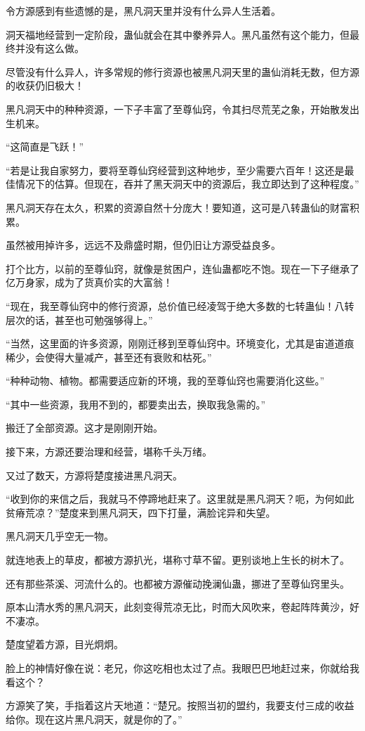 \begin{this_body}
令方源感到有些遗憾的是，黑凡洞天里并没有什么异人生活着。

洞天福地经营到一定阶段，蛊仙就会在其中豢养异人。黑凡虽然有这个能力，但最终并没有这么做。

尽管没有什么异人，许多常规的修行资源也被黑凡洞天里的蛊仙消耗无数，但方源的收获仍旧极大！

黑凡洞天中的种种资源，一下子丰富了至尊仙窍，令其扫尽荒芜之象，开始散发出生机来。

“这简直是飞跃！”

“若是让我自家努力，要将至尊仙窍经营到这种地步，至少需要六百年！这还是最佳情况下的估算。但现在，吞并了黑天洞天中的资源后，我立即达到了这种程度。”

黑凡洞天存在太久，积累的资源自然十分庞大！要知道，这可是八转蛊仙的财富积累。

虽然被用掉许多，远远不及鼎盛时期，但仍旧让方源受益良多。

打个比方，以前的至尊仙窍，就像是贫困户，连仙蛊都吃不饱。现在一下子继承了亿万身家，成为了货真价实的大富翁！

“现在，我至尊仙窍中的修行资源，总价值已经凌驾于绝大多数的七转蛊仙！八转层次的话，甚至也可勉强够得上。”

“当然，这里面的许多资源，刚刚迁移到至尊仙窍中。环境变化，尤其是宙道道痕稀少，会使得大量减产，甚至还有衰败和枯死。”

“种种动物、植物。都需要适应新的环境，我的至尊仙窍也需要消化这些。”

“其中一些资源，我用不到的，都要卖出去，换取我急需的。”

搬迁了全部资源。这才是刚刚开始。

接下来，方源还要治理和经营，堪称千头万绪。

又过了数天，方源将楚度接进黑凡洞天。

“收到你的来信之后，我就马不停蹄地赶来了。这里就是黑凡洞天？呃，为何如此贫瘠荒凉？”楚度来到黑凡洞天，四下打量，满脸诧异和失望。

黑凡洞天几乎空无一物。

就连地表上的草皮，都被方源扒光，堪称寸草不留。更别谈地上生长的树木了。

还有那些茶溪、河流什么的。也都被方源催动挽澜仙蛊，挪进了至尊仙窍里头。

原本山清水秀的黑凡洞天，此刻变得荒凉无比，时而大风吹来，卷起阵阵黄沙，好不凄凉。

楚度望着方源，目光炯炯。

脸上的神情好像在说：老兄，你这吃相也太过了点。我眼巴巴地赶过来，你就给我看这个？

方源笑了笑，手指着这片天地道：“楚兄。按照当初的盟约，我要支付三成的收益给你。现在这片黑凡洞天，就是你的了。”


\end{this_body}
